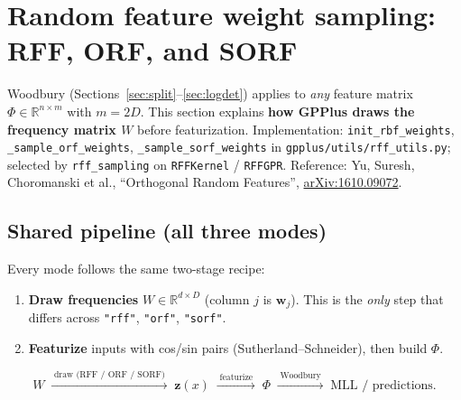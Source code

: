 \documentclass[11pt]{article}
\newcommand{\Ph}{\Phi}
\begin{document}
\section{Random feature weight sampling: RFF, ORF, and SORF}
\label{sec:rff-sampling}

Woodbury (Sections~\ref{sec:split}--\ref{sec:logdet}) applies to \emph{any} feature matrix $\Ph\in\mathbb{R}^{n\times m}$
with $m=2D$. This section explains \textbf{how GPPlus draws the frequency matrix $W$} before featurization.
Implementation: \texttt{init\_rbf\_weights}, \texttt{\_sample\_orf\_weights}, \texttt{\_sample\_sorf\_weights}
in \texttt{gpplus/utils/rff\_utils.py}; selected by \texttt{rff\_sampling} on \texttt{RFFKernel} / \texttt{RFFGPR}.
Reference: Yu, Suresh, Choromanski et al., ``Orthogonal Random Features'',
\href{https://arxiv.org/abs/1610.09072}{arXiv:1610.09072}.

\subsection{Shared pipeline (all three modes)}

Every mode follows the same two-stage recipe:
\begin{enumerate}
  \item \textbf{Draw frequencies} $W\in\mathbb{R}^{d\times D}$ (column $j$ is $\mathbf w_j$).
        This is the \emph{only} step that differs across \texttt{"rff"}, \texttt{"orf"}, \texttt{"sorf"}.
  \item \textbf{Featurize} inputs with cos/sin pairs (Sutherland--Schneider), then build $\Ph$.
\end{enumerate}

\begin{equation}
  \label{eq:pipeline}
  \boxed{
  W \;\xrightarrow{\;\text{draw (RFF / ORF / SORF)}\;}\;
  \mathbf z(x) \;\xrightarrow{\;\text{featurize}\;}\;
  \Ph \;\xrightarrow{\;\text{Woodbury}\;}\;
  \text{MLL / predictions}.
  }
\end{equation}
\end{document}
